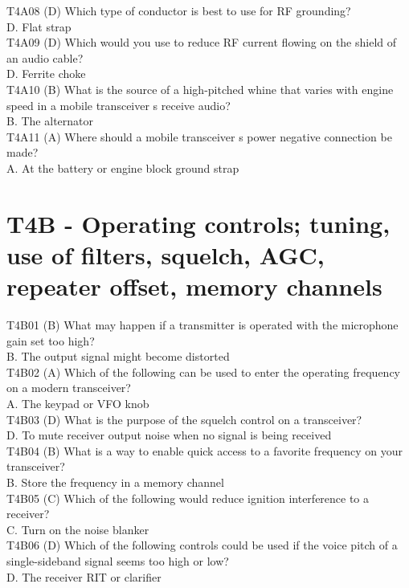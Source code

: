 \documentclass[12pt,letterpaper]{report}
\begin{document}
T4A08 (D) Which type of conductor is best to use for RF grounding?\\
D. Flat strap\\

T4A09 (D) Which would you use to reduce RF current flowing on the shield of an audio cable?\\
D. Ferrite choke\\

T4A10 (B) What is the source of a high-pitched whine that varies with engine speed in a mobile transceiver s receive audio?\\
B. The alternator\\

T4A11 (A) Where should a mobile transceiver s power negative connection be made?\\
A. At the battery or engine block ground strap\\

\section{T4B - Operating controls; tuning, use of filters, squelch, AGC, repeater offset, memory channels}

T4B01 (B) What may happen if a transmitter is operated with the microphone gain set too high?\\
B. The output signal might become distorted\\

T4B02 (A) Which of the following can be used to enter the operating frequency on a modern transceiver?\\
A. The keypad or VFO knob\\

T4B03 (D) What is the purpose of the squelch control on a transceiver?\\
D. To mute receiver output noise when no signal is being received\\

T4B04 (B) What is a way to enable quick access to a favorite frequency on your transceiver?\\
B. Store the frequency in a memory channel\\

T4B05 (C) Which of the following would reduce ignition interference to a receiver?\\
C. Turn on the noise blanker\\

T4B06 (D) Which of the following controls could be used if the voice pitch of a single-sideband signal seems too high or low?\\
D. The receiver RIT or clarifier\\
\end{document}
